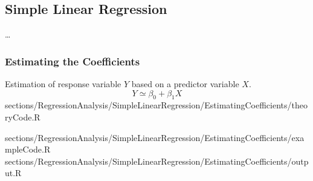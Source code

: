 \subsection{Simple Linear Regression}


\dots

\subsubsection{Estimating the Coefficients}

\RTheory
	{Estimation of response variable $Y$ based on a predictor variable $X$.%
	$$ Y \simeq \beta_0 + \beta_1X$$}
	{sections/RegressionAnalysis/SimpleLinearRegression/EstimatingCoefficients/theoryCode.R}


\RExample
	{sections/RegressionAnalysis/SimpleLinearRegression/EstimatingCoefficients/exampleCode.R}
	{sections/RegressionAnalysis/SimpleLinearRegression/EstimatingCoefficients/output.R}
	{}
